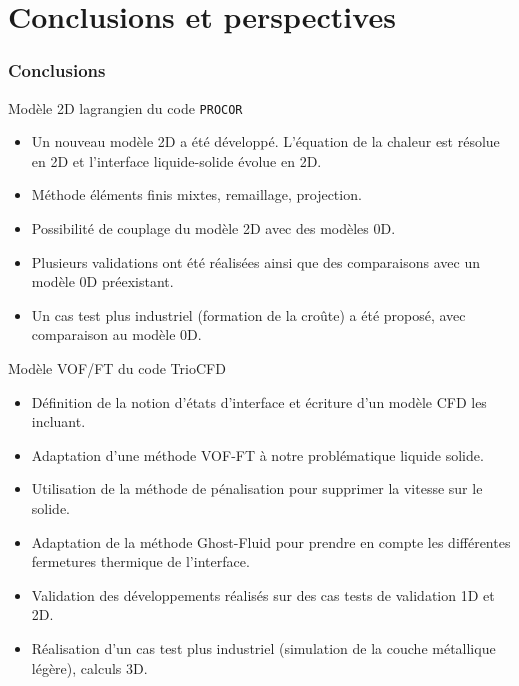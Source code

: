\documentclass{beamer}
\newcommand{\procor}{\texttt{PROCOR}}
\begin{document}
\section{Conclusions et perspectives}

\begin{frame}
    \frametitle{Conclusions}
    \scriptsize
    \begin{ceablock}{Modèle 2D lagrangien du code \procor}
        \begin{itemize}
            \item Un nouveau modèle 2D a été développé. L'équation de la chaleur est résolue en 2D et l'interface liquide-solide évolue en 2D.
            \item Méthode éléments finis mixtes, remaillage, projection.
            \item Possibilité de couplage du modèle 2D avec des modèles 0D.
            \item Plusieurs validations ont été réalisées ainsi que des comparaisons avec un modèle 0D préexistant.
            \item Un cas test plus industriel (formation de la croûte) a été proposé, avec comparaison au modèle 0D.
        \end{itemize}
    \end{ceablock}
    
     \begin{ceablock}{Modèle VOF/FT du code TrioCFD}
        \begin{itemize}
        	\item Définition de la notion d'états d'interface et écriture d'un modèle CFD les incluant.
            \item Adaptation d'une méthode VOF-FT à notre problématique liquide solide.
            \item Utilisation de la méthode de pénalisation pour supprimer la vitesse sur le solide.
            \item Adaptation de la méthode Ghost-Fluid pour prendre en compte les différentes fermetures thermique de l'interface.
            \item Validation des développements réalisés sur des cas tests de validation 1D et 2D.
            \item Réalisation d'un cas test plus industriel (simulation de la couche métallique légère), calculs 3D.
        \end{itemize}
    \end{ceablock}

\end{frame}
\end{document}
